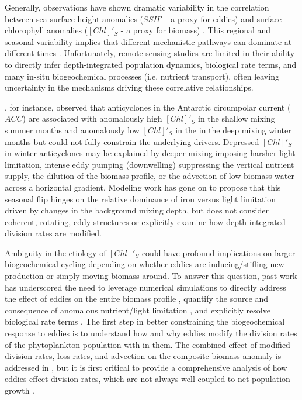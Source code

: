 \documentclass{article}
\begin{document}
Generally, observations have shown dramatic variability in the correlation between sea surface height anomalies ($SSH'$ - a proxy for eddies) and surface chlorophyll anomalies ($[Chl]'_{S}$ - a proxy for biomass) \parencite{GaubeSatelliteObservationsMesoscale2014,GaubeSatelliteobservationschlorophyll2013, SongSeasonalvariationcorrelation2018}. This regional and seasonal variability implies that different mechanistic pathways can dominate at different times \parencite{GaubeRegionalvariationsinfluence2014}. Unfortunately, remote sensing studies are limited in their ability to directly infer depth-integrated population dynamics, biological rate terms, and many in-situ biogeochemical processes (i.e. nutrient transport), often leaving uncertainty in the mechanisms driving these correlative relationships. 

\textcite{FrengerImprintSouthernOcean2018}, for instance, observed that anticyclones in the Antarctic circumpolar current ($ACC$) are associated with anomalously high $[Chl]'_{S}$ in the shallow mixing summer months and anomalously low $[Chl]'_{S}$ in the in the deep mixing winter months but could not fully constrain the underlying drivers. Depressed $[Chl]'_{S}$ in winter anticyclones may be explained by deeper mixing imposing harsher light limitation, intense eddy pumping (downwelling) suppressing the vertical nutrient supply, the dilution of the biomass profile, or the advection of low biomass water across a horizontal gradient.
Modeling work \parencite{SongSeasonalvariationcorrelation2018} has gone on to propose that this seasonal flip hinges on the relative dominance of iron versus light limitation driven by changes in the background mixing depth, but does not consider coherent, rotating, eddy structures or explicitly examine how depth-integrated division rates are modified. 

Ambiguity in the etiology of $[Chl]'_{S}$ could have profound implications on larger biogeochemical cycling depending on whether eddies are inducing/stifling new production or simply moving biomass around. To answer this question, past work has underscored the need to leverage numerical simulations to directly address the effect of eddies on the entire biomass profile \parencite{GaubeRegionalvariationsinfluence2014}, quantify the source and consequence of anomalous nutrient/light limitation \parencite{SongSeasonalvariationcorrelation2018}, and explicitly resolve biological rate terms \parencite{FrengerImprintSouthernOcean2018}. The first step in better constraining the biogeochemical response to eddies is to understand how and why eddies modify the division rates of the  phytoplankton population with in them. The combined effect of modified division rates, loss rates, and advection on the composite biomass anomaly is addressed in \textcite{RohrEddyInducedVariabilityinprep.}, but it is first critical to provide a comprehensive analysis of how eddies effect division rates, which are not always well coupled to net population growth \parencite{RohrVariabilitymechanismscontrolling2017}.
\end{document}

